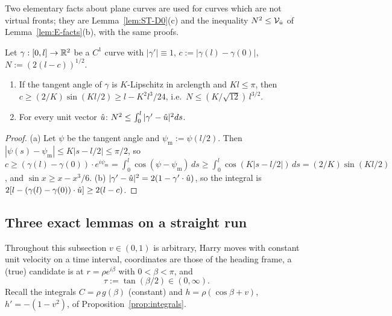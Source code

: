 Two elementary facts about plane curves are used for curves which are not virtual fronts; they are Lemma~\ref{lem:ST-D0}(c) and the
inequality $N^2\le\mathcal V_{\hat u}$ of Lemma~\ref{lem:E-facts}(b), with the same proofs.

\begin{lemma}\label{lem:T1-elem}
Let $\gamma:[0,l]\to\mathbb{R}^2$ be a $C^1$ curve with $|\gamma'|\equiv1$, $c:=|\gamma(l)-\gamma(0)|$, $N:=(2(l-c))^{1/2}$.
\begin{enumerate}
\item[(a)] If the tangent angle of $\gamma$ is $K$-Lipschitz in arclength and $Kl\le\pi$, then $c\ge(2/K)\sin(Kl/2)\ge l-K^2l^3/24$,
i.e.\ $N\le(K/\sqrt{12})\,l^{3/2}$.
\item[(b)] For every unit vector $\hat u$: $N^2\le\int_0^l|\gamma'-\hat u|^2ds$.
\end{enumerate}
\end{lemma}
\begin{proof}
(a) Let $\psi$ be the tangent angle and $\psi_{\mathrm m}:=\psi(l/2)$. Then $|\psi(s)-\psi_{\mathrm m}|\le K|s-l/2|\le\pi/2$, so
$c\ge(\gamma(l)-\gamma(0))\cdot e^{i\psi_{\mathrm m}}=\int_0^l\cos(\psi-\psi_{\mathrm m})\,ds\ge\int_0^l\cos(K|s-l/2|)\,ds=(2/K)\sin(Kl/2)$,
and $\sin x\ge x-x^3/6$. (b) $|\gamma'-\hat u|^2=2(1-\gamma'\cdot\hat u)$, so the integral is
$2[l-(\gamma(l)-\gamma(0))\cdot\hat u]\ge2(l-c)$.
\end{proof}

\subsection{Three exact lemmas on a straight run}\label{sec:T1-exact}

Throughout this subsection $v\in(0,1)$ is arbitrary, Harry moves with constant unit velocity on a time interval, coordinates are
those of the heading frame, a (true) candidate is at $r=\rho e^{i\beta}$ with $0<\beta<\pi$, and
\[
\tau:=\tan(\beta/2)\in(0,\infty).
\]
Recall the integrals $C=\rho\,g(\beta)$ (constant) and $h=\rho(\cos\beta+v)$, $h'=-(1-v^2)$, of Proposition~\ref{prop:integrals}.

